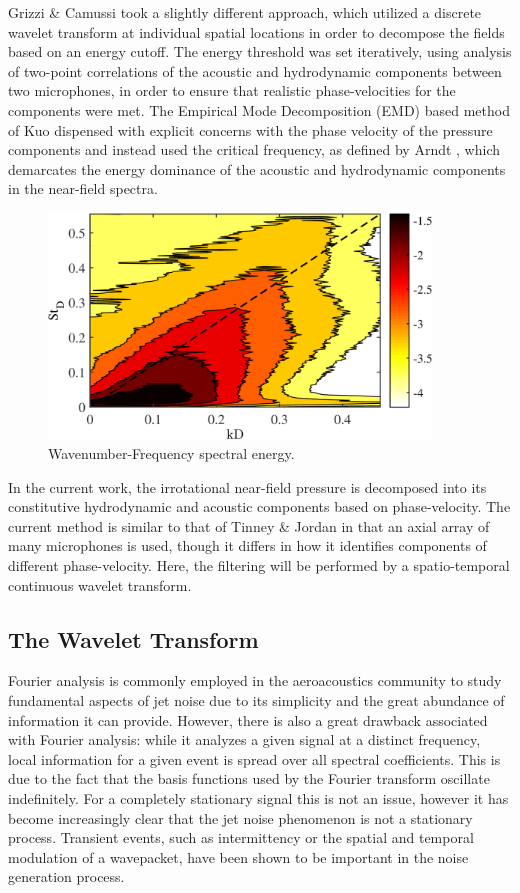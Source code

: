Grizzi \& Camussi \citep{Grizzi2012} took a slightly different approach, which utilized a discrete wavelet transform at individual spatial locations in order to decompose the fields based on an energy cutoff. 
The energy threshold was set iteratively, using analysis of two-point correlations of the acoustic and hydrodynamic components between two microphones, in order to ensure that realistic phase-velocities for the components were met. 
The Empirical Mode Decomposition (EMD) based method of Kuo \etal \citep{Kuo2013} dispensed with explicit concerns with the phase velocity of the pressure components and instead used the critical frequency, as defined by Arndt \etal \citep{Arndt1997}, which demarcates the energy dominance of the acoustic and hydrodynamic components in the near-field spectra.
\begin{figure}
	\centering
	\includegraphics[width=4in]{Figures/Phase_Velocity_Map.png}
	\caption{Wavenumber-Frequency spectral energy.}
	\label{fig:phase_velocity_map}
\end{figure}

In the current work, the irrotational near-field pressure is decomposed into its constitutive hydrodynamic and acoustic components based on phase-velocity. 
The current method is similar to that of Tinney \& Jordan \citep{Tinney2008} in that an axial array of many microphones is used, though it differs in how it identifies components of different phase-velocity.
Here, the filtering will be performed by a spatio-temporal continuous wavelet transform.

\subsection{The Wavelet Transform}
Fourier analysis is commonly employed in the aeroacoustics community to study fundamental aspects of jet noise due to its simplicity and the great abundance of information it can provide. 
However, there is also a great drawback associated with Fourier analysis: while it analyzes a given signal at a distinct frequency, local information for a given event is spread over all spectral coefficients. 
This is due to the fact that the basis functions used by the Fourier transform oscillate indefinitely. 
For a completely stationary signal this is not an issue, however it has become increasingly clear that the jet noise phenomenon is not a stationary process.
Transient events, such as intermittency or the spatial and temporal modulation of a wavepacket, have been shown to be important in the noise generation process. 

